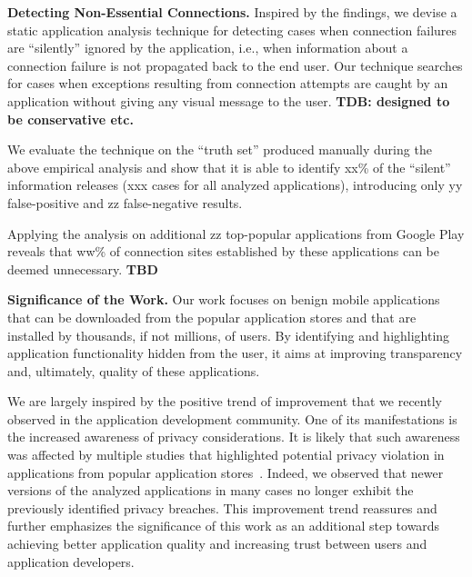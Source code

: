 

\vspace{0.1in}
\noindent 
{\bf Detecting Non-Essential Connections.}
Inspired by the findings, we devise a static application analysis technique for detecting cases when connection failures are
``silently''  ignored by the application, i.e., when information about a connection failure is not propagated back to the end user.
Our technique searches for cases when exceptions resulting from connection attempts are caught by an application without giving any visual message to the user. 
{\bf TDB: designed to be conservative etc.}

We evaluate the technique on the ``truth set'' produced manually during the above empirical analysis and show that it is able to identify xx\% of the ``silent'' information releases (xxx cases for all analyzed applications), introducing only yy false-positive and zz false-negative results. 

Applying the analysis on additional zz top-popular applications from Google Play reveals that ww\% of connection sites established by these applications can be deemed unnecessary.
{\bf TBD}


\vspace{0.1in}
\noindent 
{\bf Significance of the Work.}
Our work focuses on benign  mobile applications that can be downloaded from the popular application stores and that are installed by thousands, if not millions, of users.
By identifying and highlighting application functionality hidden from the user, it aims at improving transparency and, ultimately, quality of these applications. 
 
We are largely inspired by the positive trend of improvement that we recently observed in the application development community.
One of its manifestations is the increased awareness of privacy considerations. It is likely that such awareness was affected by multiple studies that highlighted
potential privacy violation in applications from popular application stores~\cite{Enck:Gilbert:Chun:Cox:Jung:McDaniel:Sheth:OSDI10, Egele:Kruegel:Kirda:Vign:NDSS11,Tripp:Rubin:SEC14}.
Indeed, we observed that newer versions of the analyzed applications in many cases no longer exhibit the previously identified privacy breaches.  
This improvement trend reassures and further emphasizes the significance of this work as an additional step towards achieving better application quality and increasing trust between users and application developers. 

